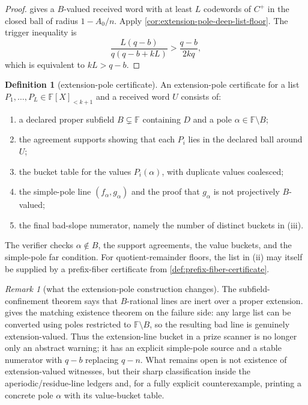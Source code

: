 \documentclass[11pt]{article}
\theoremstyle{definition}
\newtheorem{definition}[theorem]{Definition}
\theoremstyle{remark}
\newtheorem{remark}[theorem]{Remark}
\newcommand{\F}{\mathbb{F}}
\newcommand{\B}{B}
\begin{document}
\begin{proof}
 gives a $\B$-valued received word with
at least $L$ codewords of $C^+$ in the closed ball of radius $1-A_0/n$.  Apply
\cref{cor:extension-pole-deep-list-floor}.  The trigger inequality is
\[
        \frac{L(q-b)}{q(q-b+kL)}>
        \frac{q-b}{2kq},
\]
which is equivalent to $kL>q-b$.
\end{proof}

\begin{definition}[extension-pole certificate]
\label{def:extension-pole-certificate}
An extension-pole certificate for a list $P_1,\ldots,P_L\in\F[X]_{<k+1}$ and a
received word $U$ consists of:
\begin{enumerate}[label=\textup{(\roman*)},leftmargin=2.2em]
\item a declared proper subfield $\B\subsetneq\F$ containing $D$ and a pole
$\alpha\in\F\setminus\B$;
\item the agreement supports showing that each $P_i$ lies in the declared ball
around $U$;
\item the bucket table for the values $P_i(\alpha)$, with duplicate values
coalesced;
\item the simple-pole line $(f_\alpha,g_\alpha)$ and the proof that
$g_\alpha$ is not projectively $\B$-valued;
\item the final bad-slope numerator, namely the number of distinct buckets in
\textup{(iii)}.
\end{enumerate}
The verifier checks $\alpha\notin\B$, the support agreements, the value buckets,
and the simple-pole far condition.  For quotient-remainder floors, the list in
\textup{(ii)} may itself be supplied by a prefix-fiber certificate from
\cref{def:prefix-fiber-certificate}.
\end{definition}

\begin{remark}[what the extension-pole construction changes]
\label{rem:extension-pole-status}
The subfield-confinement theorem says that $\B$-rational lines are inert over a
proper extension.   gives the matching
existence theorem on the failure side: any large list can be converted using
poles restricted to $\F\setminus\B$, so the resulting bad line is genuinely
extension-valued.  Thus the extension-line bucket in a prize scanner is no
longer only an abstract warning; it has an explicit simple-pole source and a
stable numerator with $q-b$ replacing $q-n$.  What remains open is not existence
of extension-valued witnesses, but their sharp classification inside the
aperiodic/residue-line ledgers and, for a fully explicit counterexample, printing
a concrete pole $\alpha$ with its value-bucket table.
\end{remark}
\end{document}
